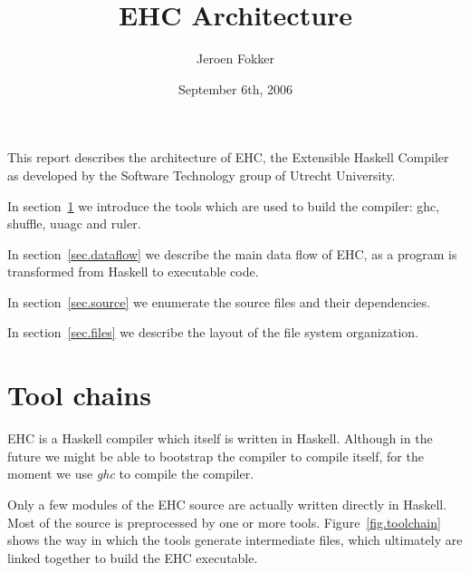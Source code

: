 

\title{EHC Architecture}
\author{Jeroen Fokker}
\date{September 6th, 2006}
\maketitle


This report describes the architecture of EHC,
the Extensible Haskell Compiler as developed
by the Software Technology group of Utrecht University.

In section~\ref{sec.toolchain} we introduce the tools which are used to build the compiler:
ghc, shuffle, uuagc and ruler.

In section~\ref{sec.dataflow} we describe the main data flow of EHC,
as a program is transformed from Haskell to executable code.

In section~\ref{sec.source} we enumerate the source files and their dependencies.

In section~\ref{sec.files} we describe the layout of the file system organization.

\clearpage
\section{Tool chains}\label{sec.toolchain}

EHC is a Haskell compiler which itself is written in Haskell.
Although in the future we might be able to bootstrap the compiler
to compile itself, for the moment we use {\em ghc} to compile the compiler.

Only a few modules of the EHC source are actually written directly in Haskell.
Most of the source is preprocessed by one or more tools.
Figure~\ref{fig.toolchain} shows the way in which the tools generate intermediate files,
which ultimately are linked together to build the EHC executable.

